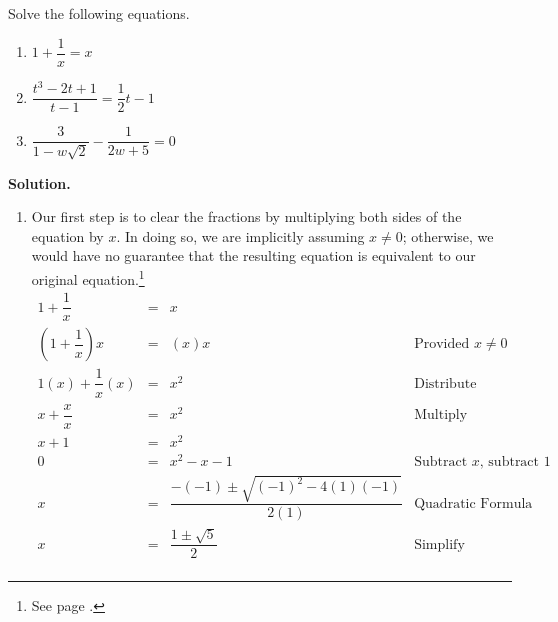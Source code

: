 \documentclass[10pt]{article}
\begin{document}
\begin{ex}\label{rateqnreviewex} Solve the following equations.

\begin{multicols}{3}
\begin{enumerate}

\item  $1 + \dfrac{1}{x} = x$

\item  $\dfrac{t^3-2t+1}{t-1} = \dfrac{1}{2}t-1$

\item  $\dfrac{3}{1 - w\sqrt{2}} - \dfrac{1}{2w+5} = 0$

\setcounter{HW}{\value{enumi}}
\end{enumerate}

\end{multicols}




{\bf Solution.} 

\begin{enumerate}

\item   Our first step is to clear the fractions by multiplying both sides of the equation by $x$. In doing so, we are implicitly assuming $x \neq 0$; otherwise, we would have no guarantee that the resulting equation is equivalent to our original equation.\footnote{See page \pageref{equivalenteqnineq}.}\[ \begin{array}{rclr}

1 + \dfrac{1}{x} & = & x & \\ [8pt]

\left(1 + \dfrac{1}{x}\right) x & = & (x)x & \text{Provided $x \neq 0$} \\ [10pt]


1(x) + \dfrac{1}{x} (x) & = & x^2 & \text{Distribute} \\ [8pt]

x + \dfrac{x}{x} & = & x^2 & \text{Multiply} \\ [8pt]

x + 1 & = & x^2 &  \\

0 & = & x^2 - x - 1 & \text{Subtract $x$, subtract $1$} \\ [5pt]

x & = & \dfrac{-(-1) \pm \sqrt{(-1)^2 - 4(1)(-1)}}{2(1)} & \text{Quadratic Formula} \\

x & = & \dfrac{1 \pm \sqrt{5}}{2} & \text{Simplify} \\


\end{array}\]
\end{enumerate}
\end{ex}
\end{document}
